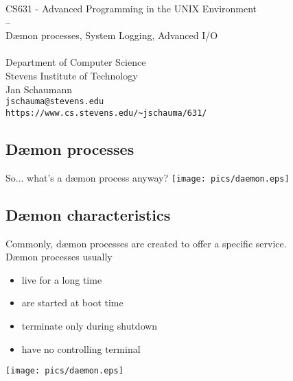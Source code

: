 \documentclass[xga]{xdvislides}
\begin{document}
\setfontphv

\lhead{\slidetitle}
\cfoot{\relax}
\rfoot{\Gray{\today}}

\newcommand{\smallish}{\fontsize{15}{20}\selectfont}

\vspace*{\fill}
\begin{center}
	\Hugesize
		CS631 - Advanced Programming in the UNIX Environment\\
		-- \\
		D\ae mon processes, System Logging, Advanced I/O\\
	\hspace*{5mm}\blueline\\ [1em]
	\Normalsize
		Department of Computer Science\\
		Stevens Institute of Technology\\
		Jan Schaumann\\
		\verb+jschauma@stevens.edu+\\
		\verb+https://www.cs.stevens.edu/~jschauma/631/+
\end{center}
\vspace*{\fill}

\subsection{D\ae mon processes}
So... what's a d\ae mon process anyway?
\vfill
\hfill\texttt{[image: pics/daemon.eps]} \\

\subsection{D\ae mon characteristics}
Commonly, d\ae mon processes are created to offer a specific service.
\\

D\ae mon processes usually
\begin{itemize}
	\item live for a long time
	\item are started at boot time
	\item terminate only during shutdown
	\item have no controlling terminal
\end{itemize}

\vfill
\hfill\texttt{[image: pics/daemon.eps]} \\
\end{document}
